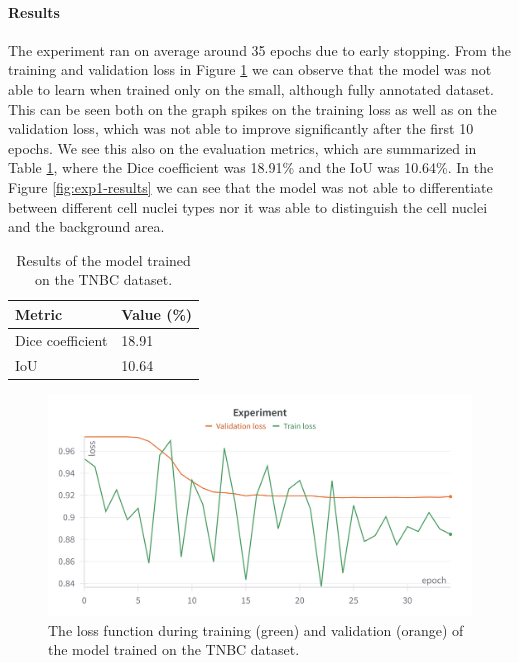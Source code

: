 \paragraph{Results}
The experiment ran on average around 35 epochs due to early stopping. From the training and validation loss in Figure \ref{fig:exp1-loss} we can observe that the model was not able to learn when trained only on the small, although fully annotated dataset. This can be seen both on the graph spikes on the training loss as well as on the validation loss, which was not able to improve significantly after the first 10 epochs. We see this also on the evaluation metrics, which are summarized in Table \ref{tab:exp1-metrics}, where the Dice coefficient was 18.91\% and the IoU was 10.64\%. In the Figure \ref{fig:exp1-results} we can see that the model was not able to differentiate between different cell nuclei types nor it was able to distinguish the cell nuclei and the background area.

\begin{table}[H]
\centering
\begin{tabular}{ p{5.0cm} | p{5.0cm} }
\hline
\textbf{Metric} & \textbf{Value (\%)} \\ 
\hline
Dice coefficient &  18.91 \\ 
\hline
IoU &  10.64 \\ 
\hline
\end{tabular}
\caption{Results of the model trained on the TNBC dataset.}
\label{tab:exp1-metrics}
\end{table}

\begin{figure}[H]
\begin{centering}
\includegraphics[width=\textwidth]{assets/images/for_presentation/exp1-loss.png}
\par\end{centering}
\caption{The loss function during training (green) and validation (orange) of the model trained on the TNBC dataset.
\label{fig:exp1-loss}}
\end{figure}

